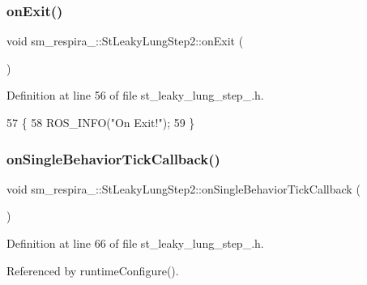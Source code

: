 \subsubsection{\texorpdfstring{on\+Exit()}{onExit()}}
{\footnotesize\ttfamily void sm\+\_\+respira\+\_\+::\+St\+Leaky\+Lung\+Step2\+::on\+Exit (\begin{DoxyParamCaption}{ }\end{DoxyParamCaption})\hspace{0.3cm}{\ttfamily [inline]}}



Definition at line 56 of file st\+\_\+leaky\+\_\+lung\+\_\+step\+\_.\+h.


\begin{DoxyCode}
57     \{
58         ROS\_INFO(\textcolor{stringliteral}{"On Exit!"});
59     \}
\end{DoxyCode}
\mbox{\label{structsm__respira__1_1_1StLeakyLungStep2_a0961f0efffd2c0140dd9cfdbcf9a7160}} 
\subsubsection{\texorpdfstring{on\+Single\+Behavior\+Tick\+Callback()}{onSingleBehaviorTickCallback()}}
{\footnotesize\ttfamily void sm\+\_\+respira\+\_\+::\+St\+Leaky\+Lung\+Step2\+::on\+Single\+Behavior\+Tick\+Callback (\begin{DoxyParamCaption}{ }\end{DoxyParamCaption})\hspace{0.3cm}{\ttfamily [inline]}}



Definition at line 66 of file st\+\_\+leaky\+\_\+lung\+\_\+step\+\_.\+h.



Referenced by runtime\+Configure().


